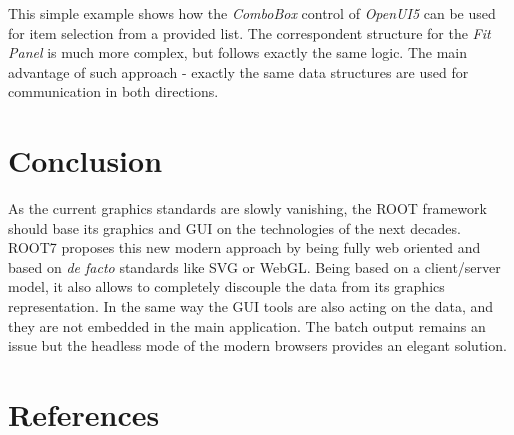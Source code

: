 \documentclass[a4paper]{jpconf}
\begin{document}
This simple example shows how the \textit{ComboBox} control of \textit{OpenUI5} can be used for item selection from a provided list.
The correspondent structure for the \textit{Fit Panel} is much more complex, but follows exactly the same logic.
The main advantage of such approach - exactly the same data structures are used for communication in both directions.


\section{Conclusion}

As the current graphics standards are slowly vanishing, the ROOT framework should
base its graphics and GUI on the technologies of the next decades. ROOT7 proposes
this new modern approach by being fully web oriented and based on \textit{de facto} standards
like SVG or WebGL. Being based on a client/server model, it also allows to completely
discouple the data from its graphics representation. In the same way the GUI tools
are also acting on the data, and they are not embedded in the main application.
The batch output remains an issue but the headless mode of the modern browsers provides an elegant solution.


\section{References}

\end{document}
